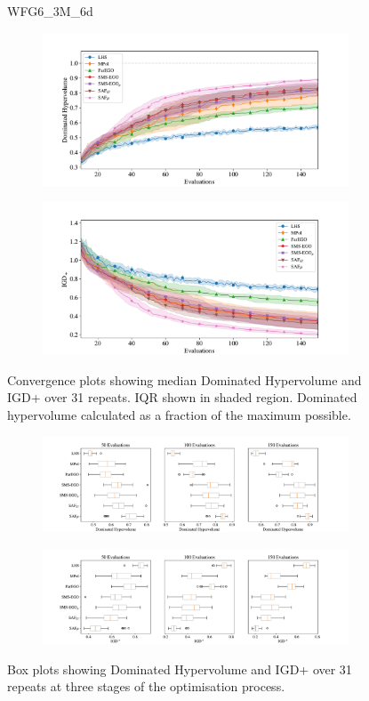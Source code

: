 \documentclass[conference]{IEEEtran}
\begin{document}
\begin{figure}
WFG6\_3M\_6d


\begin{subfigure}[hbt!]{\linewidth}

    \centering
    \includegraphics[width=0.7\linewidth]{figures/wfg6_3obj_6dim_hv_plot.pdf}
\end{subfigure}
\begin{subfigure}[h]{\linewidth}
    \centering
    \includegraphics[width=0.7\linewidth]{figures/wfg6_3obj_6dim_igd_plot.pdf}
\end{subfigure}
    \caption{Convergence plots showing median Dominated Hypervolume and IGD+ over 31 repeats. IQR shown in shaded region. Dominated hypervolume calculated as a fraction of the maximum possible.}
\vspace{\floatsep}
\begin{subfigure}[t]{\linewidth}
    \centering
    \includegraphics[width=0.8\linewidth]{figures/wfg6_3obj_6dim_hv_boxplot.pdf}
\end{subfigure}
\begin{subfigure}[t]{\linewidth}
    \centering
    \includegraphics[width=0.8\linewidth]{figures/wfg6_3obj_6dim_igd_boxplot.pdf}
\end{subfigure}
    \caption{Box plots showing Dominated Hypervolume and IGD+ over 31 repeats at three stages of the optimisation process.}
\end{figure}
\clearpage
\end{document}
